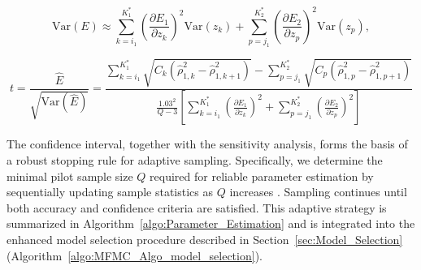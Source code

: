 \[
\text{Var}(E) \approx \sum_{k=i_1}^{K_1^*} \left(\frac{\partial E_1}{\partial z_k}\right)^2\text{Var}(z_k) + \sum_{p=j_1}^{K_2^*} \left(\frac{\partial E_2}{\partial z_p}\right)^2\text{Var}(z_p),
\]

\begin{equation}\label{eq:cost_decrease_t_test}
    t = \frac{\widehat E}{\sqrt{\text{Var}(\widehat E)}} = \frac{\sum_{k=i_1}^{K_1^*}\sqrt{C_k(\widehat \rho_{1,k}^2-\widehat\rho_{1,k+1}^2)} - \sum_{p=j_1}^{K_2^*}\sqrt{C_p(\widehat \rho_{1,p}^2-\widehat\rho_{1,p+1}^2)}}{\frac{1.03^2}{Q-3}\left[\sum_{k=i_1}^{K_1^*} \left(\frac{\partial E_1}{\partial z_k}\right)^2+\sum_{p=j_1}^{K_2^*} \left(\frac{\partial E_2}{\partial z_p}\right)^2\right]}
\end{equation}



The confidence interval, together with the sensitivity analysis, forms the basis of a robust stopping rule for adaptive sampling. Specifically, we determine the minimal pilot sample size $Q$ required for reliable parameter estimation by sequentially updating sample statistics as $Q$ increases \cite{La:2001,Wa:1947}. Sampling continues until both accuracy and confidence criteria are satisfied. This adaptive strategy is summarized in Algorithm~\ref{algo:Parameter_Estimation} and is integrated into the enhanced model selection procedure described in Section~\ref{sec:Model_Selection} (Algorithm~\ref{algo:MFMC_Algo_model_selection}).


